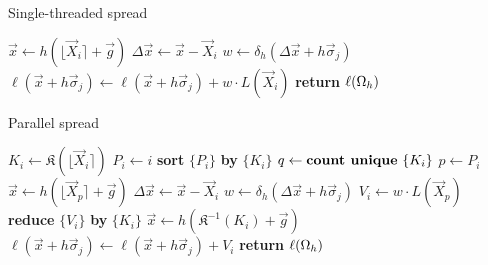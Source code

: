 \begin{algorithm}
\caption{Single-threaded spread}
\label{algo:serial-spread}
\begin{algorithmic}
    \State $\vec{x} \gets h(\lfloor\vec{X}_i\rceil+\vec{g})$
    \State $\Delta\vec{x} \gets \vec{x}-\vec{X}_i$
        \State $w \gets \delta_h(\Delta\vec{x}+h\vec{\sigma}_j)$
        \State $\ell(\vec{x}+h\vec{\sigma}_j) \gets \ell(\vec{x}+h\vec{\sigma}_j) + w \cdot L(\vec{X}_i)$
    \EndFor
\EndFor
\State \textbf{return} $\ell(\Omega_h)$
\EndProcedure
\end{algorithmic}
\end{algorithm}

\begin{algorithm}
\caption{Parallel spread}
\label{algo:par-spread}
\begin{algorithmic}
    \State $K_i \gets \mathfrak{K}(\lfloor\vec{X}_i\rceil)$ 
    \State $P_i \gets i$ 
\EndFor
\State \textbf{sort} $\{P_i\}$ \textbf{by} $\{K_i\}$
\State $q \gets \text{\textbf{count unique} }\{K_i\}$
        \State $p \gets P_i$
        \State $\vec{x} \gets h(\lfloor\vec{X}_p\rceil+\vec{g})$
        \State $\Delta\vec{x} \gets \vec{x}-\vec{X}_i$
        \State $w \gets \delta_h(\Delta\vec{x}+h\vec{\sigma}_j)$
        \State $V_i \gets w \cdot L(\vec{X}_p)$
    \EndFor
    \State \textbf{reduce} $\{V_i\}$ \textbf{by} $\{K_i\}$
        \State $\vec{x} \gets h(\mathfrak{K}^{-1}(K_i) + \vec{g})$
        \State $\ell(\vec{x} + h\vec{\sigma}_j) \gets \ell(\vec{x} + h\vec{\sigma}_j) + V_i$
    \EndFor
\EndFor
\State \textbf{return} $\ell(\Omega_h)$
\EndProcedure
\end{algorithmic}
\end{algorithm}

